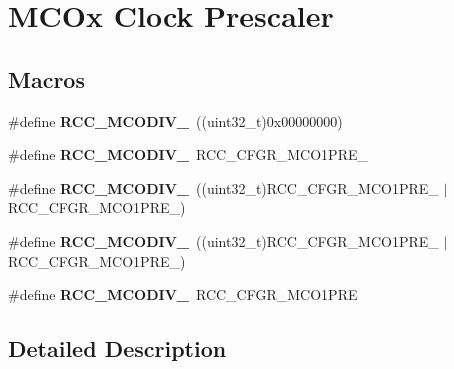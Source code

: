 \hypertarget{group___r_c_c___m_c_ox___clock___prescaler}{}\section{M\+C\+Ox Clock Prescaler}
\label{group___r_c_c___m_c_ox___clock___prescaler}
\subsection*{Macros}
\begin{DoxyCompactItemize}
\item 
\#define {\bfseries R\+C\+C\+\_\+\+M\+C\+O\+D\+I\+V\+\_}~((uint32\+\_\+t)0x00000000)\hypertarget{group___r_c_c___m_c_ox___clock___prescaler_ga438d8c3bead4e1ec5dd5757cb0313d53}{}\label{group___r_c_c___m_c_ox___clock___prescaler_ga438d8c3bead4e1ec5dd5757cb0313d53}

\item 
\#define {\bfseries R\+C\+C\+\_\+\+M\+C\+O\+D\+I\+V\+\_}~R\+C\+C\+\_\+\+C\+F\+G\+R\+\_\+\+M\+C\+O1\+P\+R\+E\+\_\hypertarget{group___r_c_c___m_c_ox___clock___prescaler_ga6198330847077f4da351915518140bfc}{}\label{group___r_c_c___m_c_ox___clock___prescaler_ga6198330847077f4da351915518140bfc}

\item 
\#define {\bfseries R\+C\+C\+\_\+\+M\+C\+O\+D\+I\+V\+\_}~((uint32\+\_\+t)R\+C\+C\+\_\+\+C\+F\+G\+R\+\_\+\+M\+C\+O1\+P\+R\+E\+\_ $\vert$ R\+C\+C\+\_\+\+C\+F\+G\+R\+\_\+\+M\+C\+O1\+P\+R\+E\+\_)\hypertarget{group___r_c_c___m_c_ox___clock___prescaler_gab9dac03733c3c5bd8877ef43bff3d5f4}{}\label{group___r_c_c___m_c_ox___clock___prescaler_gab9dac03733c3c5bd8877ef43bff3d5f4}

\item 
\#define {\bfseries R\+C\+C\+\_\+\+M\+C\+O\+D\+I\+V\+\_}~((uint32\+\_\+t)R\+C\+C\+\_\+\+C\+F\+G\+R\+\_\+\+M\+C\+O1\+P\+R\+E\+\_ $\vert$ R\+C\+C\+\_\+\+C\+F\+G\+R\+\_\+\+M\+C\+O1\+P\+R\+E\+\_)\hypertarget{group___r_c_c___m_c_ox___clock___prescaler_ga1bdc2eb56aaeb53dc3ca5cd72f22d4c8}{}\label{group___r_c_c___m_c_ox___clock___prescaler_ga1bdc2eb56aaeb53dc3ca5cd72f22d4c8}

\item 
\#define {\bfseries R\+C\+C\+\_\+\+M\+C\+O\+D\+I\+V\+\_}~R\+C\+C\+\_\+\+C\+F\+G\+R\+\_\+\+M\+C\+O1\+P\+RE\hypertarget{group___r_c_c___m_c_ox___clock___prescaler_ga67292dd05ceb8189ec439d4ac4d58b88}{}\label{group___r_c_c___m_c_ox___clock___prescaler_ga67292dd05ceb8189ec439d4ac4d58b88}

\end{DoxyCompactItemize}


\subsection{Detailed Description}
